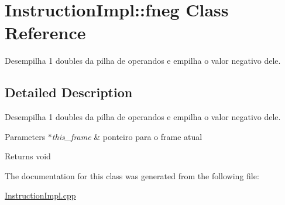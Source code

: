 \hypertarget{class_instruction_impl_1_1fneg}{}\section{Instruction\+Impl\+:\+:fneg Class Reference}
\label{class_instruction_impl_1_1fneg}


Desempilha 1 doubles da pilha de operandos e empilha o valor negativo dele.  




\subsection{Detailed Description}
Desempilha 1 doubles da pilha de operandos e empilha o valor negativo dele. 


\begin{DoxyParams}{Parameters}
{\em $\ast$this\+\_\+frame} & ponteiro para o frame atual \\
\hline
\end{DoxyParams}
\begin{DoxyReturn}{Returns}
void 
\end{DoxyReturn}


The documentation for this class was generated from the following file\+:\begin{DoxyCompactItemize}
\item 
\hyperlink{_instruction_impl_8cpp}{Instruction\+Impl.\+cpp}\end{DoxyCompactItemize}

